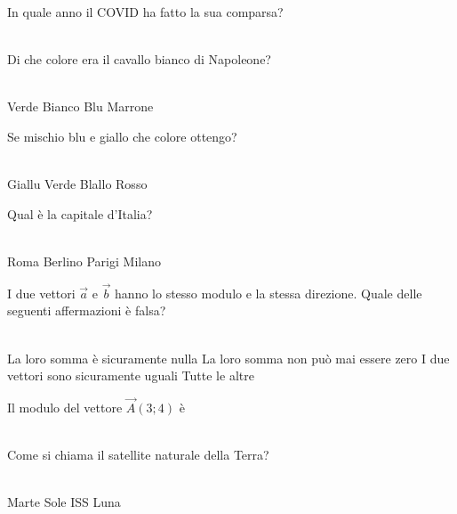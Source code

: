 \documentclass[a4paper,11pt]{exam}
\begin{document}
\begin{questions}
    
\question In quale anno il COVID ha fatto la sua comparsa?\\\
\begin{oneparchoices}
\end{oneparchoices}

    
\question Di che colore era il cavallo bianco di Napoleone?\\\
\begin{oneparchoices}
  \choice Verde
  \choice Bianco
  \choice Blu 
  \choice Marrone
\end{oneparchoices}

    
\question Se mischio blu e giallo che colore ottengo?\\\
\begin{oneparchoices}
  \choice Giallu
  \choice Verde
  \choice Blallo
  \choice Rosso
\end{oneparchoices}

    
\question Qual è la capitale d’Italia?\\\
\begin{oneparchoices}
  \choice Roma
  \choice Berlino
  \choice Parigi
  \choice Milano
\end{oneparchoices}

    
\question I due vettori $\vec{a}$ e $\vec{b}$ hanno lo stesso modulo e la stessa direzione. Quale delle seguenti affermazioni è falsa?\\\
\begin{oneparchoices}
  \choice La loro somma è sicuramente nulla
  \choice La loro somma non può mai essere zero
  \choice I due vettori sono sicuramente uguali
  \choice Tutte le altre
\end{oneparchoices}

    
\question Il modulo del vettore $\vec{A}(3;4)$ è\\\
\begin{oneparchoices}
  \choice 12
  \choice 25
  \choice 8
  \choice 5
\end{oneparchoices}

    
\question Come si chiama il satellite naturale della Terra?\\\
\begin{oneparchoices}
  \choice Marte
  \choice Sole
  \choice ISS
  \choice Luna
\end{oneparchoices}

    
\end{questions}

    
    \newpage
    
\end{document}
